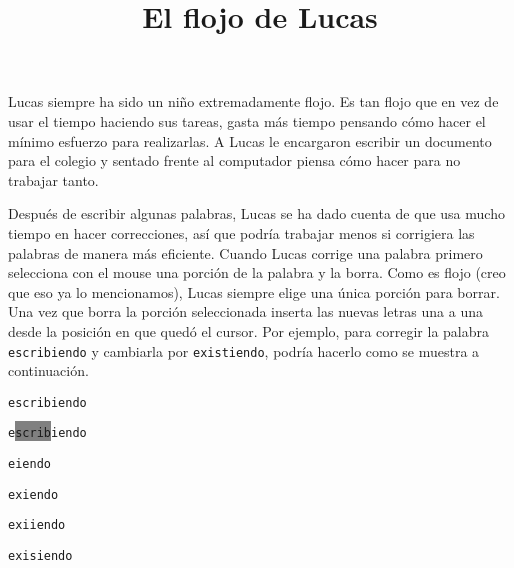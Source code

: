 \documentclass{oci}
\title{El flojo de Lucas}
\begin{document}
\begin{problemDescription}
  Lucas siempre ha sido un niño extremadamente flojo.
  Es tan flojo que en vez de usar el tiempo haciendo sus tareas, gasta más tiempo 
  pensando cómo hacer el mínimo esfuerzo para realizarlas.
  A Lucas le encargaron escribir un documento para el colegio y 
  sentado frente al computador piensa cómo hacer para no trabajar
  tanto.

  Después de escribir algunas palabras, %
  Lucas se ha dado cuenta de que   %
  usa mucho tiempo en hacer correcciones, así que podría trabajar menos si
  corrigiera las palabras de manera más eficiente.
  Cuando Lucas corrige una palabra primero selecciona con el mouse una porción
  de la palabra y la borra. Como es flojo (creo que eso ya lo mencionamos), Lucas
  siempre elige una única porción para borrar.
  Una vez que borra la porción seleccionada inserta las nuevas letras una a una
  desde la posición en que quedó el cursor. %
  Por ejemplo, para corregir la palabra \texttt{escribiendo} y cambiarla por
  \texttt{existiendo}, podría hacerlo como se muestra a continuación.

  \newcommand{\caret}{{\color{gray}\hspace{-0.2em}\raisebox{-0.1em}{\scalebox{1.1}{|}}\hspace{-0.24em}}}
  \begin{center}
  \begin{minipage}{100pt}
    \texttt{escribiendo}

    \texttt{e\colorbox{gray}{\hspace{-0.24em}scrib\hspace{-0.24em}}iendo}

    \texttt{e\caret{}iendo}

    \texttt{ex\caret{}iendo}

    \texttt{exi\caret{}iendo}
    
    \texttt{exis\caret{}iendo}


\end{minipage}
\end{center}
\end{problemDescription}
\end{document}
